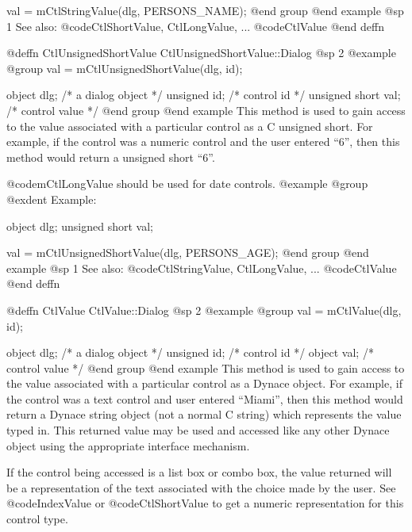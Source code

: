 val = mCtlStringValue(dlg, PERSONS_NAME);
@end group
@end example
@sp 1
See also:  @code{CtlShortValue, CtlLongValue, ...}
        @code{CtlValue}
@end deffn











@deffn {CtlUnsignedShortValue} CtlUnsignedShortValue::Dialog
@sp 2
@example
@group
val = mCtlUnsignedShortValue(dlg, id);

object  dlg;    /*  a dialog object  */
unsigned id;    /*  control id       */
unsigned short  val;    /*  control value    */
@end group
@end example
This method is used to gain access to the value associated with a
particular control as a C unsigned short.  For example, if the control
was a numeric control and the user entered ``6'', then this method
would return a unsigned short ``6''.

@code{mCtlLongValue} should be used for date controls.
@example
@group
@exdent Example:

object  dlg;
unsigned short  val;

val = mCtlUnsignedShortValue(dlg, PERSONS_AGE);
@end group
@end example
@sp 1
See also:  @code{CtlStringValue, CtlLongValue, ...}
        @code{CtlValue}
@end deffn














@deffn {CtlValue} CtlValue::Dialog
@sp 2
@example
@group
val = mCtlValue(dlg, id);

object  dlg;    /*  a dialog object  */
unsigned id;    /*  control id       */
object  val;    /*  control value    */
@end group
@end example
This method is used to gain access to the value associated with a
particular control as a Dynace object.  For example, if the control
was a text control and user entered ``Miami'', then this method
would return a Dynace string object (not a normal C string) which
represents the value typed in.  This returned value may be used
and accessed like any other Dynace object using the appropriate
interface mechanism.

If the control being accessed is a list box or combo box, the value
returned will be a representation of the text associated with the choice
made by the user.  See @code{IndexValue} or @code{CtlShortValue} to get
a numeric representation for this control type.

